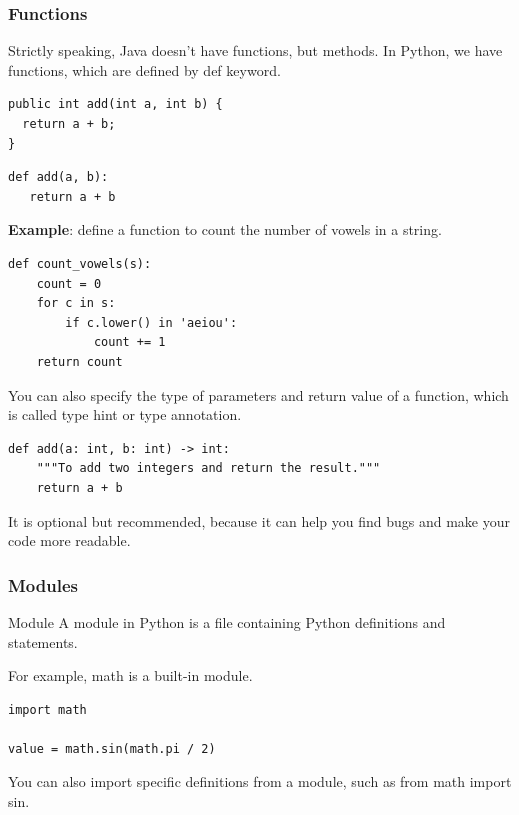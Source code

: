 \documentclass[aspectratio=169, 14pt]{beamer}
\begin{document}
\begin{frame}[fragile]
	\frametitle{Functions}
	Strictly speaking, Java doesn't have functions, but methods. In Python, we have functions, which are defined by \alert{def} keyword.

	\begin{verbatim}
public int add(int a, int b) {
  return a + b;
}
  \end{verbatim}

	\begin{verbatim}
def add(a, b):
   return a + b
  \end{verbatim}

\end{frame}

\begin{frame}[fragile]

	\textbf{Example}: define a function to count the number of vowels in a string.

	\begin{verbatim}
def count_vowels(s):
    count = 0
    for c in s:
        if c.lower() in 'aeiou':
            count += 1
    return count
  \end{verbatim}
\end{frame}

\begin{frame}[fragile]
	You can also specify the type of parameters and return value of a function, which is called \alert{type hint} or \alert{type annotation}.

	\begin{verbatim}
def add(a: int, b: int) -> int:
    """To add two integers and return the result."""
    return a + b
  \end{verbatim}

	It is optional but recommended, because it can help you find bugs and make your code more readable.
\end{frame}

\begin{frame}[fragile]
	\frametitle{Modules}
	\begin{exampleblock}{Module}
		A module in Python is a file containing Python definitions and statements.
	\end{exampleblock}
	For example, \alert{math} is a built-in module.

	\begin{verbatim}
import math

value = math.sin(math.pi / 2)
  \end{verbatim}
	You can also import specific definitions from a module, such as \alert{from math import sin}.
\end{frame}
\end{document}

